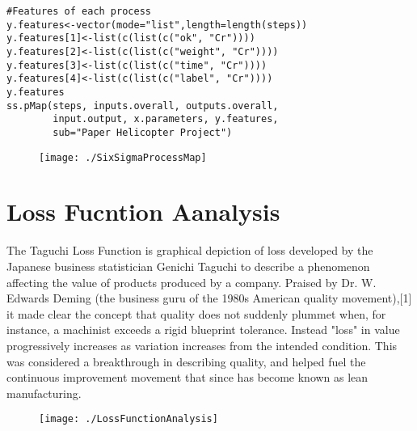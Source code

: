 \documentclass[11pt]{article} %
\begin{document}
\begin{framed}
\begin{verbatim}
#Features of each process
y.features<-vector(mode="list",length=length(steps))
y.features[1]<-list(c(list(c("ok", "Cr"))))
y.features[2]<-list(c(list(c("weight", "Cr"))))
y.features[3]<-list(c(list(c("time", "Cr"))))
y.features[4]<-list(c(list(c("label", "Cr"))))
y.features
ss.pMap(steps, inputs.overall, outputs.overall,
        input.output, x.parameters, y.features,
        sub="Paper Helicopter Project")
\end{verbatim}
\end{framed}
\begin{figure}[h!]
\centering
\texttt{[image: ./SixSigmaProcessMap]}
\caption{}
\label{fig:SixSigmaProcessMap}
\end{figure}
\newpage
\section{Loss Fucntion Aanalysis}
The Taguchi Loss Function is graphical depiction of loss developed by the Japanese business statistician Genichi Taguchi to describe a phenomenon affecting the value of products produced by a company. Praised by Dr. W. Edwards Deming (the business guru of the 1980s American quality movement),[1] it made clear the concept that quality does not suddenly plummet when, for instance, a machinist exceeds a rigid blueprint tolerance. Instead "loss" in value progressively increases as variation increases from the intended condition. This was considered a breakthrough in describing quality, and helped fuel the continuous improvement movement that since has become known as lean manufacturing.

\begin{figure}[h!]
\centering
\texttt{[image: ./LossFunctionAnalysis]}
\caption{}
\label{fig:LossFunctionAnalysis}
\end{figure}
\end{document}
